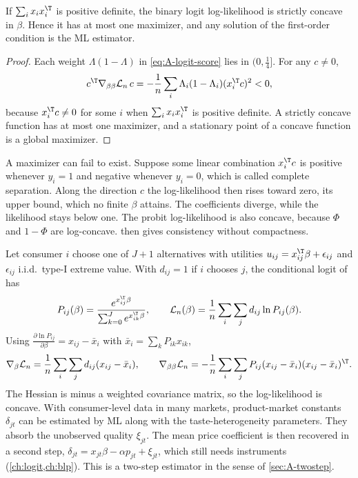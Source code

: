 \begin{proposition}\label{prop:A-logit-concave}
If $\sum_ix_ix_i^\T$ is positive definite, the binary logit log-likelihood is strictly concave in $\beta$. Hence it has at
most one maximizer, and any solution of the first-order condition is the ML estimator.
\end{proposition}

\begin{proof}
Each weight $\Lambda(1 - \Lambda)$ in \eqref{eq:A-logit-score} lies in $(0, \frac{1}{4}]$. For any $c \ne 0$,
\begin{equation*}
  c^\T\nabla_{\beta\beta}\mathcal{L}_n\,c = -\frac{1}{n}\sum_i\Lambda_i(1 - \Lambda_i)(x_i^\T c)^2 < 0,
\end{equation*}
because $x_i^\T c \ne 0$ for some $i$ when $\sum_ix_ix_i^\T$ is positive definite. A strictly concave function has at most one
maximizer, and a stationary point of a concave function is a global maximizer.
\end{proof}

A maximizer can fail to exist. Suppose some linear combination $x_i^\T c$ is positive whenever $y_i = 1$ and negative
whenever $y_i = 0$, which is called complete separation. Along the direction $c$ the log-likelihood then rises toward
zero, its upper bound, which no finite $\beta$ attains. The coefficients diverge, while the likelihood stays below one.
The probit log-likelihood is also concave, because $\Phi$ and
$1 - \Phi$ are log-concave.  then gives consistency without compactness.

Let consumer $i$ choose one of $J + 1$ alternatives with utilities $u_{ij} = x_{ij}^\T\beta + \epsilon_{ij}$ and $\epsilon_{ij}$
i.i.d.\ type-I extreme value. With $d_{ij} = 1$ if $i$ chooses $j$, the conditional logit of \citet{McFadden1974} has
\begin{equation*}
  P_{ij}(\beta) = \frac{e^{x_{ij}^\T\beta}}{\sum_{k=0}^Je^{x_{ik}^\T\beta}}, \qquad
  \mathcal{L}_n(\beta) = \frac{1}{n}\sum_i\sum_jd_{ij}\ln P_{ij}(\beta).
\end{equation*}
Using $\frac{\partial\ln P_{ij}}{\partial\beta} = x_{ij} - \bar x_i$ with $\bar x_i = \sum_kP_{ik}x_{ik}$,
\begin{equation*}
  \nabla_\beta\mathcal{L}_n = \frac{1}{n}\sum_i\sum_jd_{ij}(x_{ij} - \bar x_i), \qquad
  \nabla_{\beta\beta}\mathcal{L}_n = -\frac{1}{n}\sum_i\sum_jP_{ij}(x_{ij} - \bar x_i)(x_{ij} - \bar x_i)^\T.
\end{equation*}
The Hessian is minus a weighted covariance matrix, so the log-likelihood is concave. With consumer-level data in many
markets, product-market constants $\delta_{jt}$ can be estimated by ML along with the taste-heterogeneity parameters. They
absorb the unobserved quality $\xi_{jt}$. The mean price coefficient is then recovered in a second step,
$\delta_{jt} = x_{jt}\beta - \alpha p_{jt} + \xi_{jt}$, which still needs instruments (\cref{ch:logit,ch:blp}). This is a
two-step estimator in the sense of \cref{sec:A-twostep}.

